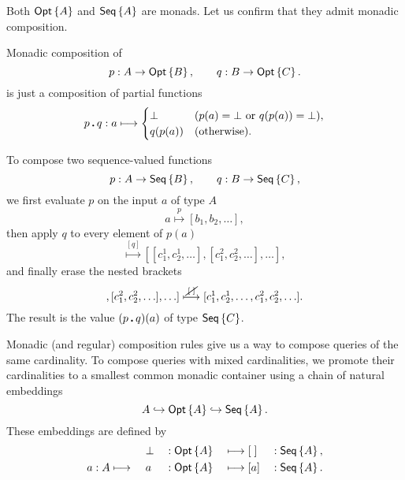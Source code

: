 Both $\textup{\textsf{Opt}}\left\{A\right\}$ and $\textup{\textsf{Seq}}\left\{A\right\}$ are monads.  Let us confirm that they admit
monadic composition.

Monadic composition of
\begin{equation*}
    p : A \to \textup{\textsf{Opt}}\left\{B\right\}, \qquad q : B \to \textup{\textsf{Opt}}\left\{C\right\}.
\end{equation*}
is just a composition of partial functions
\begin{equation*}
    p\,\boldsymbol{.}\,q : a \longmapsto \begin{cases}
        \bot & (p(a)=\bot\text{ or }q(p(a))=\bot), \\
        q(p(a)) & (\text{otherwise}).
    \end{cases}
\end{equation*}

To compose two sequence-valued functions
\begin{equation*}
    p : A \to \textup{\textsf{Seq}}\left\{B\right\}, \qquad q : B \to \textup{\textsf{Seq}}\left\{C\right\},
\end{equation*}
we first evaluate $p$ on the input $a$ of type $A$
\begin{equation*}
    a \overset{p}{\longmapsto} [b_1, b_2, \ldots],
\end{equation*}
then apply $q$ to every element of $p(a)$
\begin{equation*}
    [b_1, b_2, \ldots]
    \overset{[q]}{\longmapsto}
    [[c^{1}_{1}, c^{1}_{2}, \ldots], [c^{2}_{1}, c^{2}_{2}, \ldots], \ldots],
\end{equation*}
and finally erase the nested brackets
\begin{equation*}
    [[c^{1}_{1}, c^{1}_{2}, \ldots], [c^{2}_{1}, c^{2}_{2}, \ldots], \ldots]
    \overset{\cancel{\,[\;]\,}}{\longmapsto}
    [c^{1}_{1}, c^{1}_{2}, \ldots, c^{2}_{1}, c^{2}_{2}, \ldots].
\end{equation*}
The result is the value $(p\,\boldsymbol{.}\,q)(a)$ of type $\textup{\textsf{Seq}}\left\{C\right\}$.

Monadic (and regular) composition rules give us a way to compose queries of the
same cardinality.  To compose queries with mixed cardinalities, we promote
their cardinalities to a smallest common monadic container using a chain of
natural embeddings
\begin{equation*}
    A \hookrightarrow \textup{\textsf{Opt}}\left\{A\right\} \hookrightarrow \textup{\textsf{Seq}}\left\{A\right\}.
\end{equation*}
These embeddings are defined by
\begin{alignat*}{5}
    & \; && \bot && : \textup{\textsf{Opt}}\left\{A\right\} && \longmapsto [\;] && : \textup{\textsf{Seq}}\left\{A\right\}, \\
    & a : A \longmapsto\ && a && : \textup{\textsf{Opt}}\left\{A\right\} && \longmapsto [a] && : \textup{\textsf{Seq}}\left\{A\right\}.
\end{alignat*}

